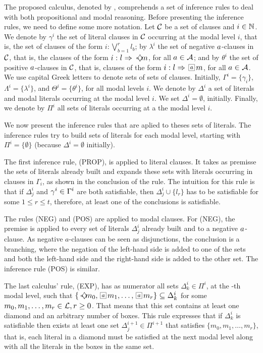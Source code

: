 The proposed calculus, denoted by \ckn, comprehends a set of inference rules to
deal with both propositional and modal reasoning. Before presenting the inference rules, we need to define some more notation. Let $\set{C}$ be a set of clauses and $i \in \Nat$. We denote by $\gamma^i$ the set of literal clauses in $\set{C}$ occurring at the modal level $i$, that is, the set of clauses of the form $i: \bigvee^r_{b=1} l_b$; by $\lambda^i$ the set of negative $\agent$-clauses in $\set{C}$, that is, the clauses of the form $i : l \then \pos{\agent}m$, for all $\agent \in \Agents$; and by $\theta^i$ the set of positive $\agent$-clauses in $\set{C}$, that is, clauses of the form $i : l \then \nec{a}m$, for all $\agent \in \Agents$. We use capital Greek letters to denote sets of sets of clauses. Initially, $\Gamma^i = \{\gamma_i\}$, $\Lambda^i = \{\lambda^i\}$, and $\Theta^i = \{\theta^i\}$, for all modal levels $i$. We denote by $\Delta^i$ a set of literals and modal literals occurring at the modal level $i$. We set $\Delta^i =\emptyset$, initially. Finally, we denote by $\Pi^i$ all sets of literals occurring at a the modal level $i$.

We now present the inference rules that are aplied to theses sets of literals. The inference rules try to build sets of literals for each modal level, starting with $\Pi^i = \{\emptyset\}$ (because $\Delta^i = \emptyset$ initially). 

The first inference rule, (PROP), is applied to literal clauses. It takes as premisse the sets of literals already built and expands these sets with literals occurring in clauses in $\Gamma_i$, as shown in the conclusion of the rule. The
intuition for this rule is that if $\Delta^i_j$ and $\gamma^\ml \in \Gamma^\ml$
are both satisfiable, then $\Delta^i_j \cup \{l_r\}$ has to be satisfiable for
some $1 \leq r \leq t$, therefore, at least one of the conclusions is
satisfiable.

The rules (NEG) and (POS) are applied to modal clauses. For (NEG), the premise is applied to every set of literals $\Delta^i_j$ already built and to a negative $\agent$-clause. As negative $a$-clauses can be seen as disjunctions, the conclusion is a branching, where the negation of the left-hand side is added to one of the sets and both the left-hand side and the right-hand side is added to the other set. The inference rule (POS) is similar.

The last calculus' rule, (EXP), has as numerator all sets $\Delta^i_k \in
\Pi^i$, at the \ml-th modal level, such that $\{\pos{a}m_0, \nec{a}m_1, \ldots,
\nec{a}m_r\} \subseteq \Delta^i_k$ for some $m_0, m_1, \ldots, m_r \in
\Literals, r \geq 0$. That means that this set contains at least one diamond and
an arbitrary number of boxes.  This rule expresses that if $\Delta^i_k$ is
satisfiable then exists at least one set $\Delta^{i+1}_j \in \Pi^{i+1}$ that
satisfies $\{m_0, m_1, \ldots, m_r\}$, that is, each literal in a diamond must
be satisfied at the next modal level along with all the literals in the boxes in
the same set.


